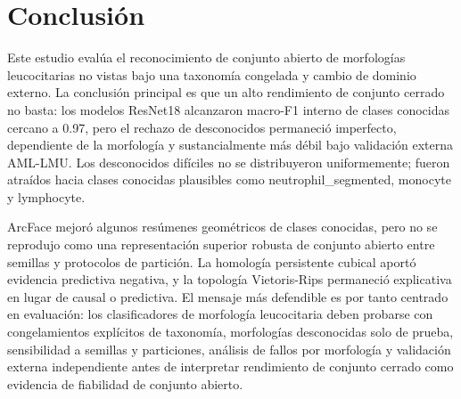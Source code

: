 \documentclass[11pt]{article}
\begin{document}
\section{Conclusión}

Este estudio evalúa el reconocimiento de conjunto abierto de morfologías leucocitarias no vistas bajo una taxonomía congelada y cambio de dominio externo. La conclusión principal es que un alto rendimiento de conjunto cerrado no basta: los modelos ResNet18 alcanzaron macro-F1 interno de clases conocidas cercano a 0.97, pero el rechazo de desconocidos permaneció imperfecto, dependiente de la morfología y sustancialmente más débil bajo validación externa AML-LMU. Los desconocidos difíciles no se distribuyeron uniformemente; fueron atraídos hacia clases conocidas plausibles como neutrophil\_segmented, monocyte y lymphocyte.

ArcFace mejoró algunos resúmenes geométricos de clases conocidas, pero no se reprodujo como una representación superior robusta de conjunto abierto entre semillas y protocolos de partición. La homología persistente cubical aportó evidencia predictiva negativa, y la topología Vietoris-Rips permaneció explicativa en lugar de causal o predictiva. El mensaje más defendible es por tanto centrado en evaluación: los clasificadores de morfología leucocitaria deben probarse con congelamientos explícitos de taxonomía, morfologías desconocidas solo de prueba, sensibilidad a semillas y particiones, análisis de fallos por morfología y validación externa independiente antes de interpretar rendimiento de conjunto cerrado como evidencia de fiabilidad de conjunto abierto.



\end{document}
